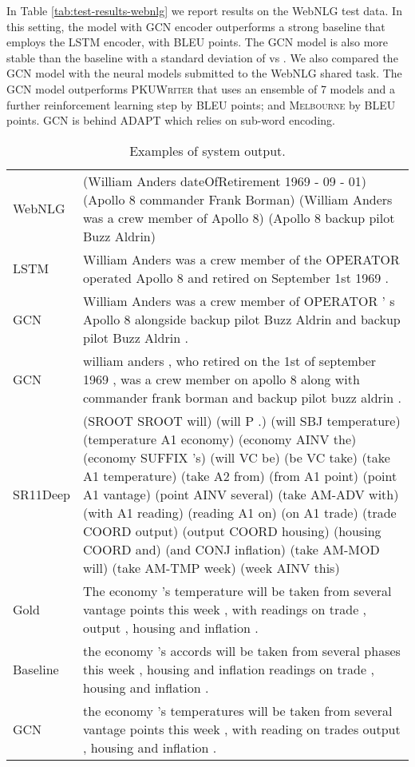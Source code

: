 \documentclass[11pt,a4paper,dvipsnames]{article}
\begin{document}
In Table \ref{tab:test-results-webnlg} we report results on the WebNLG test data.
In this setting, the model with GCN encoder outperforms a strong baseline that employs the LSTM encoder, with  BLEU points. 
The GCN model is also more stable than the baseline with a standard deviation of  vs .
We also compared the GCN model with the neural models submitted to the WebNLG shared task.
The GCN model outperforms \textsc{PKUWriter} that uses an ensemble 
of 7 models and a further reinforcement learning step by  BLEU points; and \textsc{Melbourne} by  BLEU points.
GCN is behind \textsc{ADAPT} which relies on sub-word encoding.

\begin{table*}[t]
\begin{scriptsize}
 \begin{tabular}{|@{~}p{0.8cm}p{14.5cm}@{~}|}
  \hline
WebNLG & (William Anders dateOfRetirement 1969 - 09 - 01) (Apollo 8 commander Frank Borman) (William Anders was a crew member of Apollo 8)  (Apollo 8 backup pilot Buzz Aldrin)\\
  LSTM & William Anders was a crew member of the OPERATOR operated Apollo 8 and retired on September 1st 1969 .\\
  GCN & William Anders was a crew member of OPERATOR ' s Apollo 8 alongside backup pilot Buzz Aldrin and backup pilot Buzz Aldrin .\\
  GCN & william anders , who retired on the 1st of september 1969 , was a crew member on apollo 8 along with commander frank borman and backup pilot buzz aldrin .\\

  \hline
SR11Deep & (SROOT SROOT will) (will P .) (will SBJ temperature) (temperature A1 economy) (economy AINV the) (economy SUFFIX 's) (will VC be) (be VC take) (take A1 temperature) (take A2 from) (from A1 point) (point A1 vantage) (point AINV several) (take AM-ADV with) (with A1 reading) (reading A1 on) (on A1 trade) (trade COORD output) (output COORD housing) (housing COORD and) (and CONJ inflation) (take AM-MOD will) (take AM-TMP week) (week AINV this)\\
  Gold & The economy 's temperature will be taken from several vantage points this week , with readings on trade , output , housing and inflation . \\
  Baseline & the economy 's accords will be taken from several phases this week , housing and inflation readings on trade , housing and inflation .\\
  GCN & the economy 's temperatures will be taken from several vantage points this week , with reading on trades output , housing and inflation .\\
\hline
 \end{tabular} 
\end{scriptsize}
\vspace*{-1.5ex}
\caption{\label{tab:sys-output} Examples of system output.}
\end{table*} 
\end{document}
